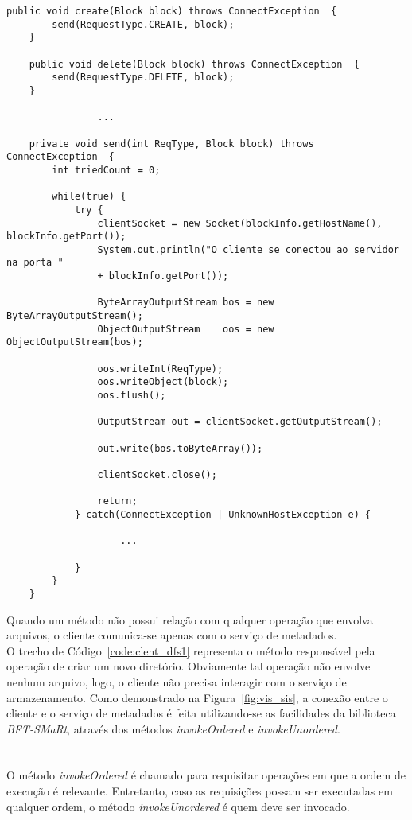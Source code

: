 \begin{lstlisting}[basicstyle=\ttfamily\footnotesize, frame=single, caption=Exemplo de métodos da classe ClientServerSocket, label=code:clent_socket2]	
	public void create(Block block) throws ConnectException  {
		send(RequestType.CREATE, block);
	}
	
	public void delete(Block block) throws ConnectException  {
		send(RequestType.DELETE, block);
	}
	
				...
	
	private void send(int ReqType, Block block) throws ConnectException  {
		int triedCount = 0;
		
		while(true) {
			try {
				clientSocket = new Socket(blockInfo.getHostName(), blockInfo.getPort());
				System.out.println("O cliente se conectou ao servidor na porta " 
				+ blockInfo.getPort());
				
				ByteArrayOutputStream bos = new ByteArrayOutputStream();
				ObjectOutputStream    oos = new ObjectOutputStream(bos);
				
				oos.writeInt(ReqType);
				oos.writeObject(block);
				oos.flush();
				
				OutputStream out = clientSocket.getOutputStream();
				
				out.write(bos.toByteArray());
				
				clientSocket.close();
				
				return;
			} catch(ConnectException | UnknownHostException e) {
			
					...
					
			}
		}
	}
\end{lstlisting}

Quando um método não possui relação com qualquer operação que envolva arquivos, o cliente comunica-se  apenas com o serviço de metadados.
\\

O trecho de Código~\ref{code:clent_dfs1} representa o método responsável pela operação de criar um novo diretório. Obviamente tal operação não envolve nenhum arquivo, logo, o cliente não precisa interagir com o serviço de armazenamento. Como demonstrado na Figura~\ref{fig:vis_sis}, a conexão entre o cliente e o serviço de metadados é feita utilizando-se as facilidades da biblioteca \textit{BFT-SMaRt}, através dos métodos \textit{invokeOrdered} e \textit{invokeUnordered}.
\\
\\
\\

O método \textit{invokeOrdered} é chamado para requisitar operações em que a ordem de execução é relevante. Entretanto, caso as requisições possam ser executadas em qualquer ordem, o método \textit{invokeUnordered} é quem deve ser invocado.
\\

